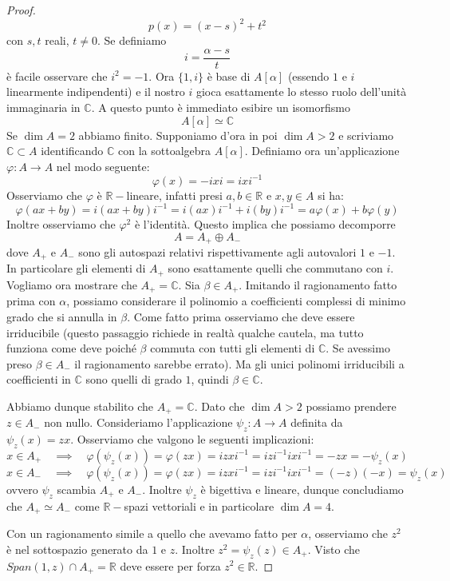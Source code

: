 \documentclass[11pt]{article}
\theoremstyle{plain}
\theoremstyle{definition}
\theoremstyle{remark}
\newcommand{\C}{\mathbb{C}}
\newcommand{\R}{\mathbb{R}}
\DeclareMathOperator{\iso}{\simeq}
\begin{document}
\begin{proof}
\[ p(x) = (x-s)^2+t^2\]
con $s,t$ reali, $t\neq 0$. Se definiamo
\[i = \frac{\alpha-s}{t}\]
è facile osservare che $i^2 = -1$. Ora $\{1, i\}$ è base di $A[\alpha]$ (essendo $1$ e $i$ linearmente indipendenti) e il nostro $i$
gioca esattamente lo stesso ruolo dell'unità immaginaria in $\C$. A questo punto è immediato esibire un isomorfismo
\[ A[\alpha] \iso \C \]
Se $\dim A =2 $ abbiamo finito. Supponiamo d'ora in poi $\dim A > 2$ e scriviamo $\C\subset A$ identificando $\C$ con la
sottoalgebra $A[\alpha]$. Definiamo ora un'applicazione $\varphi:A\to A$ nel modo seguente:
\[ \varphi(x) = -ixi = ixi^{-1} \]
Osserviamo che $\varphi$ è $\R-$lineare, infatti presi $a,b\in\R$ e $x,y\in A$ si ha:
\[ \varphi(ax+by) = i(ax+by)i^{-1} = i(ax)i^{-1} +i(by)i^{-1} = a\varphi(x) + b\varphi(y)\]
Inoltre osserviamo che $\varphi^2$ è l'identità. Questo implica che possiamo decomporre
\[ A = A_+ \oplus A_-\] dove $A_+$ e $A_-$ sono gli autospazi relativi rispettivamente agli autovalori $1$ e $-1$.
In particolare gli elementi di $A_+$ sono esattamente quelli che commutano con $i$.
Vogliamo ora mostrare che $A_+ = \C$.
Sia $\beta\in A_+$. Imitando il ragionamento fatto prima con $\alpha$, possiamo considerare il polinomio a coefficienti complessi di minimo grado
che si annulla in $\beta$. Come fatto prima osserviamo che deve essere irriducibile (questo passaggio richiede in realtà qualche cautela,
ma tutto funziona come deve poiché $\beta$ commuta con tutti gli elementi di $\C$. Se avessimo preso $\beta\in A_-$ il ragionamento sarebbe errato).
Ma gli unici polinomi irriducibili a coefficienti in $\C$ sono quelli di grado $1$, quindi $\beta\in\C$.

Abbiamo dunque stabilito che $A_+ = \C$. Dato che $\dim A > 2$ possiamo prendere $z\in A_-$ non nullo.
Consideriamo l'applicazione $\psi_z:A\to A$ definita da $\psi_z(x) = zx$.
Osserviamo che valgono le seguenti implicazioni:
\[ x\in A_+ \quad\implies\quad \varphi(\psi_z(x)) = \varphi(zx) = izxi^{-1} = izi^{-1}ixi^{-1} = -zx = -\psi_z(x)\]
\[ x\in A_- \quad\implies\quad \varphi(\psi_z(x)) = \varphi(zx) = izxi^{-1} = izi^{-1}ixi^{-1} = (-z)(-x) = \psi_z(x)\]
ovvero $\psi_z$ scambia $A_+$ e $A_-$. Inoltre $\psi_z$ è bigettiva e lineare, dunque concludiamo che $A_+\iso A_-$ come $\R-$spazi vettoriali e in particolare $\dim A = 4$.

Con un ragionamento simile a quello che avevamo fatto per $\alpha$, osserviamo che $z^2$ è nel sottospazio generato da $1$ e $z$. Inoltre $z^2=\psi_z(z)\in A_+$.
Visto che $Span(1,z) \cap A_+ = \R$ deve essere per forza $z^2\in\R$.


\end{proof}
\end{document}
